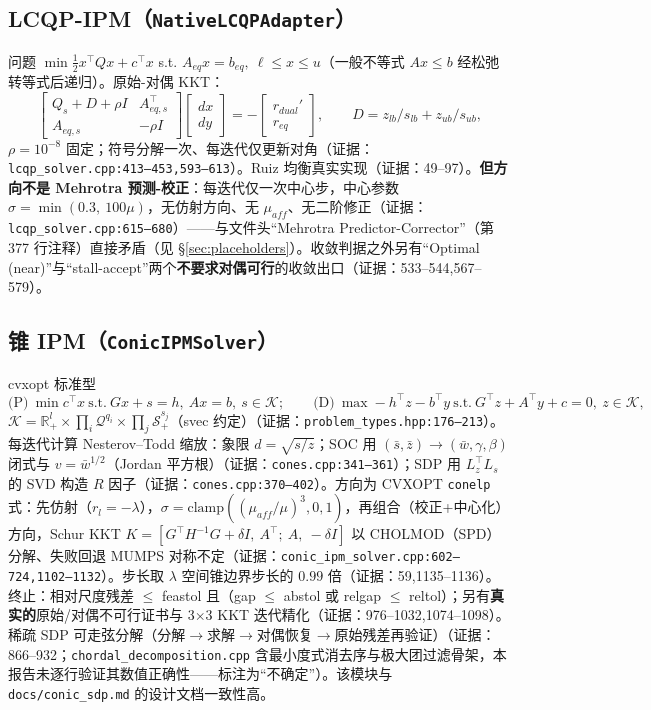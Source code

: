 \documentclass[11pt,a4paper]{ctexart}
\newcommand{\file}[1]{\texttt{#1}}
\newcommand{\func}[1]{\texttt{#1}}
\newcommand{\R}{\mathbb{R}}
\newcommand{\evid}[1]{{\footnotesize\color{black!70}（证据：#1）}}
\begin{document}
\subsection{LCQP-IPM（\func{NativeLCQPAdapter}）}
问题 $\min \tfrac12 x^{\top}Qx + c^{\top}x$ s.t. $A_{eq}x=b_{eq},\ \ell\le x\le u$（一般不等式 $Ax\le b$ 经松弛转等式后递归）。原始-对偶 KKT：
\begin{equation}
\begin{bmatrix} Q_s + D + \rho I & A_{eq,s}^{\top} \\ A_{eq,s} & -\rho I \end{bmatrix}
\begin{bmatrix} dx \\ dy \end{bmatrix} = -\begin{bmatrix} r_{dual}' \\ r_{eq} \end{bmatrix},\qquad
D = z_{lb}/s_{lb} + z_{ub}/s_{ub},
\end{equation}
$\rho{=}10^{-8}$ 固定；符号分解一次、每迭代仅更新对角\evid{\file{lcqp\_solver.cpp:413--453,593--613}}。Ruiz 均衡真实实现\evid{49--97}。\textbf{但方向不是 Mehrotra 预测-校正}：每迭代仅一次中心步，中心参数 $\sigma = \min(0.3,\ 100\mu)$，无仿射方向、无 $\mu_{aff}$、无二阶修正\evid{\file{lcqp\_solver.cpp:615--680}}——与文件头``Mehrotra Predictor-Corrector''（第 377 行注释）直接矛盾（见 \S\ref{sec:placeholders}）。收敛判据之外另有``Optimal (near)''与``stall-accept''两个\textbf{不要求对偶可行}的收敛出口\evid{533--544,567--579}。

\subsection{锥 IPM（\func{ConicIPMSolver}）}
cvxopt 标准型
\begin{equation}
\text{(P)}\ \min c^{\top}x\ \text{s.t.}\ Gx+s=h,\ Ax=b,\ s\in\mathcal K;\qquad
\text{(D)}\ \max -h^{\top}z - b^{\top}y\ \text{s.t.}\ G^{\top}z + A^{\top}y + c = 0,\ z\in\mathcal K,
\end{equation}
$\mathcal K = \R^l_+ \times \prod_i \mathcal Q^{q_i} \times \prod_j \mathcal S^{s_j}_+$（svec 约定）\evid{\file{problem\_types.hpp:176--213}}。每迭代计算 Nesterov--Todd 缩放：象限 $d=\sqrt{s/z}$；SOC 用 $(\bar s,\bar z)\to(\bar w,\gamma,\beta)$ 闭式与 $v=\bar w^{1/2}$（Jordan 平方根）\evid{\file{cones.cpp:341--361}}；SDP 用 $L_z^{\top}L_s$ 的 SVD 构造 $R$ 因子\evid{\file{cones.cpp:370--402}}。方向为 CVXOPT \func{conelp} 式：先仿射（$r_l=-\lambda$），$\sigma=\mathrm{clamp}((\mu_{aff}/\mu)^3,0,1)$，再组合（校正+中心化）方向，Schur KKT $K=[G^{\top}H^{-1}G+\delta I,\ A^{\top};\ A,\ -\delta I]$ 以 CHOLMOD（SPD）分解、失败回退 MUMPS 对称不定\evid{\file{conic\_ipm\_solver.cpp:602--724,1102--1132}}。步长取 $\lambda$ 空间锥边界步长的 $0.99$ 倍\evid{59,1135--1136}。终止：相对尺度残差 $\le$ feastol 且（gap $\le$ abstol 或 relgap $\le$ reltol）；另有\textbf{真实的}原始/对偶不可行证书与 3$\times$3 KKT 迭代精化\evid{976--1032,1074--1098}。稀疏 SDP 可走弦分解（分解$\to$求解$\to$对偶恢复$\to$原始残差再验证）\evid{866--932；\file{chordal\_decomposition.cpp} 含最小度式消去序与极大团过滤骨架，本报告未逐行验证其数值正确性——标注为``不确定''}。该模块与 \file{docs/conic\_sdp.md} 的设计文档一致性高。
\end{document}

